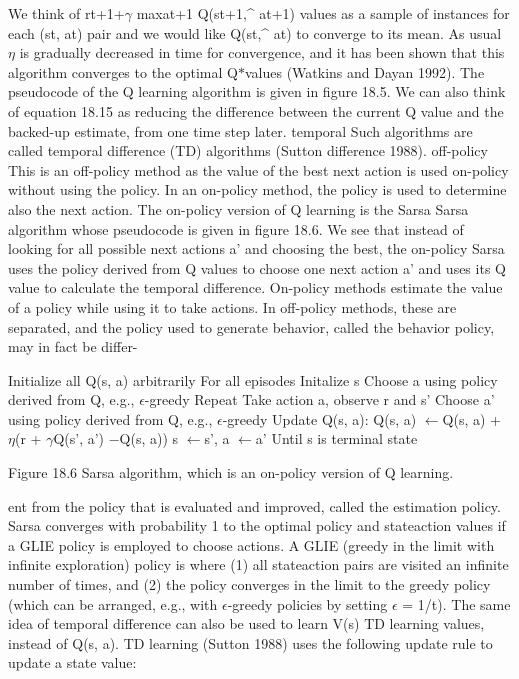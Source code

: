 We think of rt+1+$\gamma$ maxat+1 Q(st+1,\textasciicircum{} at+1) values as a sample of instances for each (st, at) pair and we would like Q(st,\textasciicircum{} at) to converge to its mean. As usual $\eta$ is gradually decreased in time for convergence, and it has been shown that this algorithm converges to the optimal Q$*$values (Watkins and Dayan 1992). The pseudocode of the Q learning algorithm is given in figure 18.5. We can also think of equation 18.15 as reducing the difference between the current Q value and the backed-up estimate, from one time step later. temporal Such algorithms are called temporal difference (TD) algorithms (Sutton difference 1988). off-policy This is an off-policy method as the value of the best next action is used on-policy without using the policy. In an on-policy method, the policy is used to determine also the next action. The on-policy version of Q learning is the Sarsa Sarsa algorithm whose pseudocode is given in figure 18.6. We see that instead of looking for all possible next actions a' and choosing the best, the on-policy Sarsa uses the policy derived from Q values to choose one next action a' and uses its Q value to calculate the temporal difference. On-policy methods estimate the value of a policy while using it to take actions. In off-policy methods, these are separated, and the policy used to generate behavior, called the behavior policy, may in fact be differ-

Initialize all Q(s, a) arbitrarily For all episodes Initalize s Choose a using policy derived from Q, e.g., $\epsilon$-greedy Repeat Take action a, observe r and s' Choose a' using policy derived from Q, e.g., $\epsilon$-greedy Update Q(s, a): Q(s, a) $\leftarrow$Q(s, a) + $\eta$(r + $\gamma$Q(s', a') $-$Q(s, a)) s $\leftarrow$s', a $\leftarrow$a' Until s is terminal state

Figure 18.6 Sarsa algorithm, which is an on-policy version of Q learning.

ent from the policy that is evaluated and improved, called the estimation policy. Sarsa converges with probability 1 to the optimal policy and stateaction values if a GLIE policy is employed to choose actions. A GLIE (greedy in the limit with infinite exploration) policy is where (1) all stateaction pairs are visited an infinite number of times, and (2) the policy converges in the limit to the greedy policy (which can be arranged, e.g., with $\epsilon$-greedy policies by setting $\epsilon$ = 1/t). The same idea of temporal difference can also be used to learn V(s) TD learning values, instead of Q(s, a). TD learning (Sutton 1988) uses the following update rule to update a state value:

